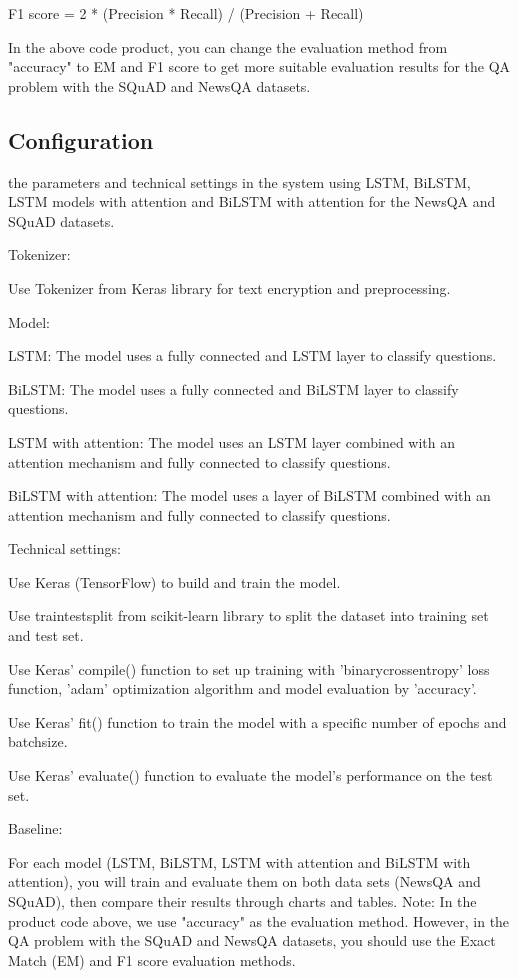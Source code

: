 \documentclass[11pt]{article}
\begin{document}
F1 score = 2 * (Precision * Recall) / (Precision + Recall)

In the above code product, you can change the evaluation method from "accuracy" to EM and F1 score to get more suitable evaluation results for the QA problem with the SQuAD and NewsQA datasets.
\subsection{Configuration}
the parameters and technical settings in the system using LSTM, BiLSTM, LSTM models with attention and BiLSTM with attention for the NewsQA and SQuAD datasets.

Tokenizer:

Use Tokenizer from Keras library for text encryption and preprocessing.

Model:

LSTM: The model uses a fully connected and LSTM layer to classify questions.

BiLSTM: The model uses a fully connected and BiLSTM layer to classify questions.

LSTM with attention: The model uses an LSTM layer combined with an attention mechanism and fully connected to classify questions.

BiLSTM with attention: The model uses a layer of BiLSTM combined with an attention mechanism and fully connected to classify questions.

Technical settings:

Use Keras (TensorFlow) to build and train the model.

Use traintestsplit from scikit-learn library to split the dataset into training set and test set.

Use Keras' compile() function to set up training with 'binarycrossentropy' loss function, 'adam' optimization algorithm and model evaluation by 'accuracy'.

Use Keras' fit() function to train the model with a specific number of epochs and batchsize.

Use Keras' evaluate() function to evaluate the model's performance on the test set.

Baseline:

For each model (LSTM, BiLSTM, LSTM with attention and BiLSTM with attention), you will train and evaluate them on both data sets (NewsQA and SQuAD), then compare their results through charts and tables.
Note: In the product code above, we use "accuracy" as the evaluation method. However, in the QA problem with the SQuAD and NewsQA datasets, you should use the Exact Match (EM) and F1 score evaluation methods.
\end{document}
